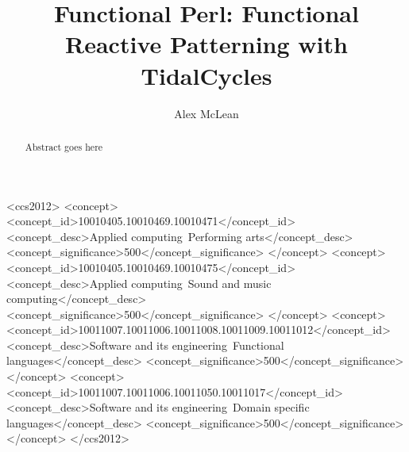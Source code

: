 \documentclass[acmsmall]{acmart}
\begin{document}
%
\title{Functional Perl: Functional Reactive Patterning with TidalCycles}

\author{Alex McLean}

%

%
\begin{abstract}
Abstract goes here
\end{abstract}

%
%

\begin{CCSXML}
<ccs2012>
<concept>
<concept_id>10010405.10010469.10010471</concept_id>
<concept_desc>Applied computing~Performing arts</concept_desc>
<concept_significance>500</concept_significance>
</concept>
<concept>
<concept_id>10010405.10010469.10010475</concept_id>
<concept_desc>Applied computing~Sound and music computing</concept_desc>
<concept_significance>500</concept_significance>
</concept>
<concept>
<concept_id>10011007.10011006.10011008.10011009.10011012</concept_id>
<concept_desc>Software and its engineering~Functional languages</concept_desc>
<concept_significance>500</concept_significance>
</concept>
<concept>
<concept_id>10011007.10011006.10011050.10011017</concept_id>
<concept_desc>Software and its engineering~Domain specific languages</concept_desc>
<concept_significance>500</concept_significance>
</concept>
</ccs2012>
\end{CCSXML}

\end{document}
